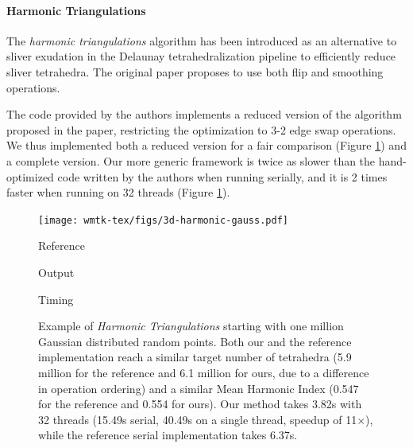 \paragraph{Harmonic Triangulations}

The \emph{harmonic triangulations} algorithm has been introduced as an alternative to sliver exudation in the Delaunay tetrahedralization pipeline to efficiently reduce sliver tetrahedra. The original paper \cite{Alexa:2019} proposes to use both flip and smoothing operations. 

The code provided by the authors implements a reduced version of the algorithm proposed in the paper, restricting the optimization to 3-2 edge swap operations. We thus implemented both a reduced version for a fair comparison (Figure \ref{fig:harmonic}) and a complete version. Our more generic framework is twice as slower than the hand-optimized code written by the authors when running serially, and it is 2 times faster when running on 32 threads (Figure \ref{fig:harmonic}).

\begin{figure}
    \centering\footnotesize
    \texttt{[image: wmtk-tex/figs/3d-harmonic-gauss.pdf]}
    \parbox{.2\linewidth}{\centering Reference}\hfill
    \parbox{.2\linewidth}{\centering Output}\hfill
    \parbox{.3\linewidth}{\centering Timing}\par
    \caption{Example of \emph{Harmonic Triangulations} starting with one million Gaussian distributed random points. {Both our and the reference implementation reach a similar target number of tetrahedra (5.9 million for the reference and 6.1 million for ours, due to a difference in operation ordering) and a similar Mean Harmonic Index (0.547 for the reference and 0.554 for ours). Our method takes 3.82s with 32 threads (15.49s serial, 40.49s on a single thread, speedup of 11$\times$), while the reference serial implementation takes 6.37s.}}
    \label{fig:harmonic}
    
    
    
\end{figure}

